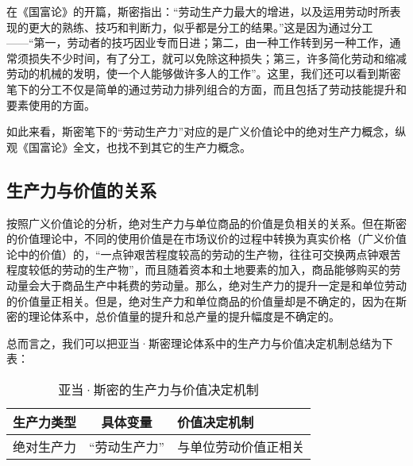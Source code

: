 在《国富论》的开篇，斯密指出：“劳动生产力最大的增进，以及运用劳动时所表现的更大的熟练、技巧和判断力，似乎都是分工的结果。”\cite[3]{YaDang*SiMiGuoFuLun2015}这是因为通过分工——“第一，劳动者的技巧因业专而日进；第二，由一种工作转到另一种工作，通常须损失不少时间，有了分工，就可以免除这种损失；第三，许多简化劳动和缩减劳动的机械的发明，使一个人能够做许多人的工作”\cite[6]{YaDang*SiMiGuoFuLun2015}。这里，我们还可以看到斯密笔下的分工不仅是简单的通过劳动力排列组合的方面，而且包括了劳动技能提升和要素使用的方面。

如此来看，斯密笔下的“劳动生产力”对应的是广义价值论中的绝对生产力概念，纵观《国富论》全文，也找不到其它的生产力概念。

\subsection{生产力与价值的关系}

按照广义价值论的分析，绝对生产力与单位商品的价值是负相关的关系。但在斯密的价值理论中，不同的使用价值是在市场议价的过程中转换为真实价格（广义价值论中的价值）的，“一点钟艰苦程度较高的劳动的生产物，往往可交换两点钟艰苦程度较低的劳动的生产物”\cite[41]{YaDang*SiMiGuoFuLun2015}，而且随着资本和土地要素的加入，商品能够购买的劳动量会大于商品生产中耗费的劳动量。那么，绝对生产力的提升一定是和单位劳动的价值量正相关。但是，绝对生产力和单位商品的价值量却是不确定的，因为在斯密的理论体系中，总价值量的提升和总产量的提升幅度是不确定的。

总而言之，我们可以把亚当·斯密理论体系中的生产力与价值决定机制总结为下表：

\begin{table}
    \caption{亚当·斯密的生产力与价值决定机制}
    \label{table:AdamSmith}
     \begin{tabularx}{\textwidth}{|c<{\centering}|c<{\centering}|X<{\centering}|}
        \toprule
        生产力类型    &具体变量    &价值决定机制 \\ \midrule

        绝对生产力    &“劳动生产力”    &与单位劳动价值正相关 \\ \bottomrule
     \end{tabularx}
\end{table}

\section{}